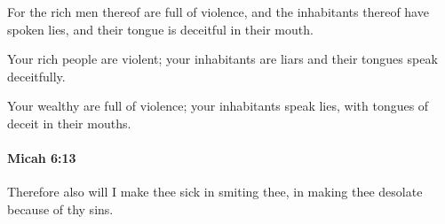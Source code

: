 			\begin{versebox}
					\item[BHS] 
					\item[LXX] 
					\item[ASV] For the rich men thereof are full of violence, and the inhabitants thereof have spoken lies, and their tongue is deceitful in their mouth.
					\item[NIV] Your rich people are violent; your inhabitants are liars and their tongues speak deceitfully.
					\item[NRSV] Your wealthy are full of violence; your inhabitants speak lies, with tongues of deceit in their mouths.
			\end{versebox}

		\paragraph{Micah 6:13} %
			\label{MICAH-6-13}

			Therefore also will I make thee sick in smiting thee, in making thee desolate because of thy sins.

